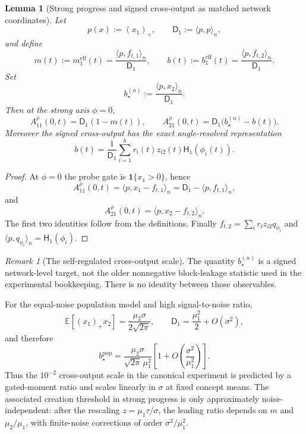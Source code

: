 \documentclass{article} %
\theoremstyle{plain}
\newtheorem{lemma}[theorem]{Lemma}
\theoremstyle{definition}
\theoremstyle{remark}
\newtheorem{remark}[theorem]{Remark}
\begin{document}

\begin{lemma}[Strong progress and signed cross-output as matched network coordinates]
\label{lem:creation-progress-coordinates}
Let
\[
p(x):=(x_1)_+,
\qquad
\mathsf D_1:=\langle p,p\rangle_n,
\]
and define
\[
\boxed{
m(t):=m_1^{\mathrm{eff}}(t)
=\frac{\langle p,f_{t,1}\rangle_n}{\mathsf D_1},
\qquad
b(t):=b_1^{\mathrm{eff}}(t)
=\frac{\langle p,f_{t,2}\rangle_n}{\mathsf D_1}.
}
\tag{creation-progress-coords}\label{eq:creation-progress-coords}
\]
Set
\[
\boxed{
b_\star^{(n)}
:=
\frac{\langle p,x_2\rangle_n}{\mathsf D_1}.
}
\tag{bstar-emp}\label{eq:bstar-emp}
\]
Then at the strong axis $\phi=0$,
\[
\boxed{
A_{11}^\rho(0,t)
=
\mathsf D_1(1-m(t)),
\qquad
A_{21}^\rho(0,t)
=
\mathsf D_1\bigl(b_\star^{(n)}-b(t)\bigr).
}
\tag{self-regulation-identities}\label{eq:self-regulation-identities}
\]
Moreover the signed cross-output has the exact angle-resolved representation
\[
\boxed{
b(t)
=
\frac1{\mathsf D_1}
\sum_{i=1}^h r_i(t)z_{i2}(t)\mathsf H_1(\phi_i(t)).
}
\tag{beff-exact}\label{eq:beff-exact}
\]
\end{lemma}

\begin{proof}
At $\phi=0$ the probe gate is $\mathbf 1\{x_1>0\}$, hence
\[
A_{11}^\rho(0,t)
=
\langle p,x_1-f_{t,1}\rangle_n
=
\mathsf D_1-\langle p,f_{t,1}\rangle_n,
\]
and
\[
A_{21}^\rho(0,t)
=
\langle p,x_2-f_{t,2}\rangle_n.
\]
The first two identities follow from the definitions.  Finally
$f_{t,2}=\sum_i r_i z_{i2}q_{\phi_i}$ and
$\langle p,q_{\phi_i}\rangle_n=\mathsf H_1(\phi_i)$.
\end{proof}

\begin{remark}[The self-regulated cross-output scale]
\label{rem:bstar-scaling}
The quantity $b_\star^{(n)}$ is a signed network-level target, not the older
nonnegative block-leakage statistic used in the experimental bookkeeping.
There is no identity between those observables.

For the equal-noise population model and high signal-to-noise ratio,
\[
\mathbb E[(x_1)_+x_2]
=
\frac{\mu_2\sigma}{2\sqrt{2\pi}},
\qquad
\mathsf D_1
=
\frac{\mu_1^2}{2}+O(\sigma^2),
\]
and therefore
\[
\boxed{
b_\star^{\mathrm{pop}}
=
\frac{\mu_2\sigma}{\sqrt{2\pi}\,\mu_1^2}
\left[1+O\!\left(\frac{\sigma^2}{\mu_1^2}\right)\right].
}
\tag{bstar-scaling}\label{eq:bstar-scaling}
\]
Thus the $10^{-2}$ cross-output scale in the canonical experiment is
predicted by a gated-moment ratio and scales linearly in $\sigma$ at fixed
concept means.  The associated creation threshold in strong progress is
only approximately noise-independent: after the rescaling
$z=\mu_1\tau/\sigma$, the leading ratio depends on
$m$ and $\mu_2/\mu_1$, with finite-noise corrections of order
$\sigma^2/\mu_1^2$.
\end{remark}
\end{document}
